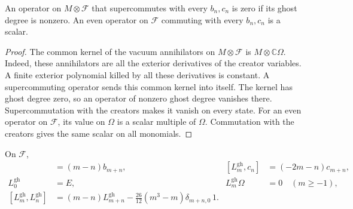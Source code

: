 \begin{lemma}\label{lem:vir-commutant}
An operator on $M\otimes\mathcal F$ that supercommutes with every $b_n,c_n$ is zero if its ghost degree is nonzero.
An even operator on $\mathcal F$ commuting with every $b_n,c_n$ is a scalar.
\end{lemma}

\begin{proof}
The common kernel of the vacuum annihilators on $M\otimes\mathcal F$ is $M\otimes\mathbb C\Omega$.
Indeed, these annihilators are all the exterior derivatives of the creator variables.
A finite exterior polynomial killed by all these derivatives is constant.
A supercommuting operator sends this common kernel into itself.
The kernel has ghost degree zero, so an operator of nonzero ghost degree vanishes there.
Supercommutation with the creators makes it vanish on every state.
For an even operator on $\mathcal F$, its value on $\Omega$ is a scalar multiple of $\Omega$.
Commutation with the creators gives the same scalar on all monomials.
\end{proof}

\begin{proposition}\label{prop:vir-ghost-central}
On $\mathcal F$,
\begin{align}
 [L_m^{\mathrm{gh}},b_n]&=(m-n)b_{m+n}, &
 [L_m^{\mathrm{gh}},c_n]&=(-2m-n)c_{m+n},
 \label{eq:vir-ghost-transform}\\
 L_0^{\mathrm{gh}}&=E, &
 L_m^{\mathrm{gh}}\Omega&=0\quad(m\geq-1),
 \label{eq:vir-ghost-energy}\\
 [L_m^{\mathrm{gh}},L_n^{\mathrm{gh}}]
 &=(m-n)L_{m+n}^{\mathrm{gh}}
 -\frac{26}{12}(m^3-m)\delta_{m+n,0}\,1.
 \label{eq:vir-ghost-central}
\end{align}
\end{proposition}

